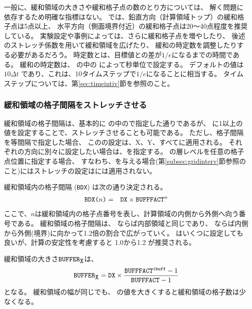 一般に、緩和領域の大きさや緩和格子点の数のとり方については、
解く問題に依存するため明確な指標はない。
\scalerm では、鉛直方向（計算領域トップ）の緩和格子点は5点以上、
水平方向（側面境界付近）の緩和格子点は20〜40点程度を推奨している。
実験設定や事例によっては、さらに緩和格子点を増やしたり、
後述のストレッチ係数を用いて緩和領域を広げたり、
緩和の時定数を調整したりする必要があるだろう。
時定数とは、目標値との差が$1/e$になるまでの時間である。
緩和の時定数は、
の中の
によって秒単位で設定する。
デフォルトの値は $10 \Delta t$ であり、これは、10タイムステップで$1/e$になることに相当する。
タイムステップについては、第\ref{sec:timeintiv}節を参照のこと。

\subsubsection{緩和領域の格子間隔をストレッチさせる}

緩和領域の格子間隔は、基本的に
の中ので指定した通りであるが、
に1以上の値を設定することで、ストレッチさせることも可能である。
ただし、格子間隔を等間隔で指定した場合、
このの設定は、X、Y、{\ZDIR}すべてに適用される。
それぞれの方向に別々に設定したい場合は、を指定する。
{\ZDIR}の層レベルを任意の格子点位置に指定する場合、
すなわち、を与える場合(第\ref{subsec:gridinterv}節参照のこと)にはストレッチの設定は{\ZDIR}には適用されない。

緩和領域内の格子間隔 (\verb|BDX|) は次の通り決定される。
\begin{eqnarray}
 \verb|BDX(|n\verb|)| &=& \verb|DX| \times \verb|BUFFFACT|^n \nonumber
\end{eqnarray}
ここで、$n$は緩和領域内の格子点番号を表し、計算領域の内側から外側へ向う番号である。
緩和領域の格子間隔は、
ならば内部領域と同じであり、
ならば内側から外側(境界)に向かって1.2倍の割合で広がっていく。
はいくつに設定しても良いが、計算の安定性を考慮すると 1.0から1.2 が推奨される。


緩和領域の大きさ$\verb|BUFFER|_{\verb|X|}$は、
\[
  \verb|BUFFER|_{\verb|X|} = \nmitemeq{DX} \times \frac{ \nmitemeq{BUFFFACT}^{\texttt{\detokenize{ibuff}}}-1}{ \nmitemeq{BUFFFACT}-1 }
\]
となる。
%
緩和領域の幅が同じでも、
の値を大きくすると緩和領域の格子数は少なくなる。


